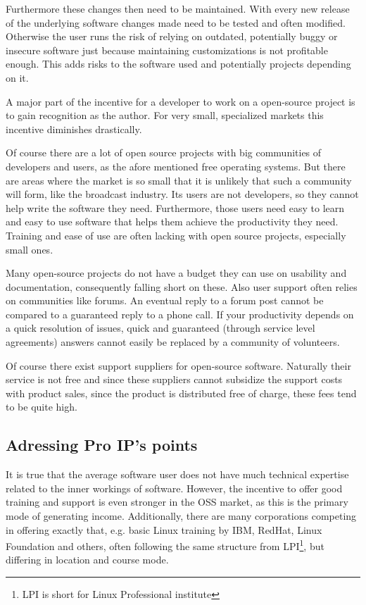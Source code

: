 \documentclass[a4paper]{report}
\begin{document}
Furthermore these changes then need to be maintained. With every new release of the underlying software changes made need to be tested and often modified. Otherwise the user runs the risk of relying on outdated, potentially buggy or insecure software just because maintaining customizations is not profitable enough. This adds risks to the software used and potentially projects depending on it.
 
A major part of the incentive for a developer to work on a open-source project is to gain recognition as the author. For very small, specialized markets this incentive diminishes drastically. 

Of course there are a lot of open source projects with big communities of developers and users, as the afore mentioned free operating systems. But there are areas where the market is so small that it is unlikely that such a community will form, like the broadcast industry. Its users are not developers, so they cannot help write the software they need. Furthermore, those users need easy to learn and easy to use software that helps them achieve the productivity they need. Training and ease of use are often lacking with open source projects, especially small ones.

Many open-source projects do not have a budget they can use on usability and documentation, consequently falling short on these. Also user support often relies on communities like forums. An eventual reply to a forum post cannot be compared to a guaranteed reply to a phone call. If your productivity depends on a quick resolution of issues, quick and guaranteed (through service level agreements) answers cannot easily be replaced by a community of volunteers. 

Of course there exist support suppliers for open-source software. Naturally their service is not free and since these suppliers cannot subsidize the support costs with product sales, since the product is distributed free of charge, these fees tend to be quite high.

\subsection{Adressing Pro IP's points}
It is true that the average software user does not have much technical expertise related to the inner workings of software. However, the incentive to offer good training and support is even stronger in the OSS market, as this is the primary mode of generating income. Additionally, there are many corporations competing in offering exactly that, e.g. basic Linux training by IBM, RedHat, Linux Foundation and others, often following the same structure from LPI\footnote{LPI is short for Linux Professional institute}, but differing in location and course mode.
\end{document}
